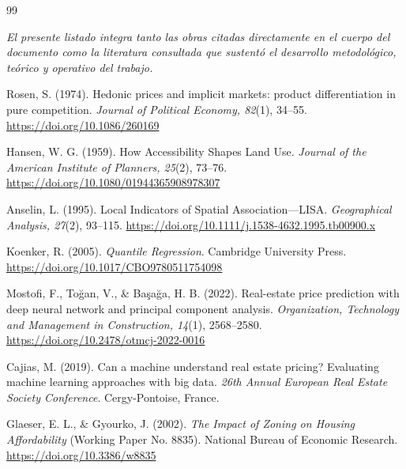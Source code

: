 \documentclass[12pt, a4paper, twoside, openright]{report}
\theoremstyle{plain}
\theoremstyle{definition}
\begin{document}
\begin{thebibliography}{99}

\noindent\textit{El presente listado integra tanto las obras citadas directamente en el cuerpo del documento como la literatura consultada que sustentó el desarrollo metodológico, teórico y operativo del trabajo.}
\vspace{1em}


Rosen, S. (1974).
Hedonic prices and implicit markets: product differentiation in pure competition.
\textit{Journal of Political Economy, 82}(1), 34--55.
\href{https://doi.org/10.1086/260169}{https://doi.org/10.1086/260169}

Hansen, W. G. (1959).
How Accessibility Shapes Land Use.
\textit{Journal of the American Institute of Planners, 25}(2), 73--76.
\href{https://doi.org/10.1080/01944365908978307}{https://doi.org/10.1080/01944365908978307}

Anselin, L. (1995).
Local Indicators of Spatial Association—LISA.
\textit{Geographical Analysis, 27}(2), 93--115.
\href{https://doi.org/10.1111/j.1538-4632.1995.tb00900.x}{https://doi.org/10.1111/j.1538-4632.1995.tb00900.x}

Koenker, R. (2005).
\textit{Quantile Regression}.
Cambridge University Press.
\href{https://doi.org/10.1017/CBO9780511754098}{https://doi.org/10.1017/CBO9780511754098}


Mostofi, F., Toğan, V., \& Başağa, H. B. (2022).
Real-estate price prediction with deep neural network and principal component analysis.
\textit{Organization, Technology and Management in Construction, 14}(1), 2568--2580.
\href{https://doi.org/10.2478/otmcj-2022-0016}{https://doi.org/10.2478/otmcj-2022-0016}

Cajias, M. (2019).
Can a machine understand real estate pricing? Evaluating machine learning approaches with big data.
\textit{26th Annual European Real Estate Society Conference}. Cergy-Pontoise, France.

Glaeser, E. L., \& Gyourko, J. (2002).
\textit{The Impact of Zoning on Housing Affordability} (Working Paper No. 8835).
National Bureau of Economic Research.
\href{https://doi.org/10.3386/w8835}{https://doi.org/10.3386/w8835}


\end{thebibliography}
\end{document}

